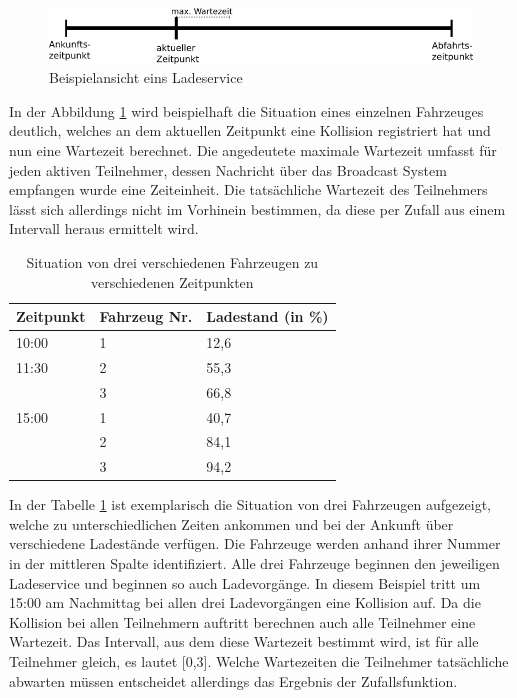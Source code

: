 \begin{figure}[htb]
	\includegraphics[width = \linewidth]{img/SA_participants_Graph2.png}
	\caption{Beispielansicht eins Ladeservice}
	\label{SAPart:Graph}
\end{figure}

In der Abbildung \ref{SAPart:Graph} wird beispielhaft die Situation eines einzelnen Fahrzeuges deutlich, welches an dem aktuellen Zeitpunkt eine Kollision registriert hat und nun eine Wartezeit berechnet. Die angedeutete maximale Wartezeit umfasst für jeden aktiven Teilnehmer, dessen Nachricht über das Broadcast System empfangen wurde eine Zeiteinheit. Die tatsächliche Wartezeit des Teilnehmers lässt sich allerdings nicht im Vorhinein bestimmen, da diese per Zufall aus einem Intervall heraus ermittelt wird.
\begin{table}[htb]
\centering
\begin{tabular}{|l|l|l|}
\hline
Zeitpunkt & Fahrzeug Nr. & Ladestand (in \%) \\ \hline \hline
10:00     & 1            & 12,6      \\ \hline
11:30     & 2            & 55,3      \\ \hline
          & 3            & 66,8      \\ \hline
15:00     & 1            & 40,7      \\ \hline
          & 2            & 84,1      \\ \hline
          & 3            & 94,2      \\ \hline
\end{tabular}
\caption{Situation von drei verschiedenen Fahrzeugen zu verschiedenen Zeitpunkten}
\label{tab:example1}
\end{table}

In der Tabelle \ref{tab:example1} ist exemplarisch die Situation von drei Fahrzeugen aufgezeigt, welche zu unterschiedlichen Zeiten ankommen und bei der Ankunft über verschiedene Ladestände verfügen. Die Fahrzeuge werden anhand ihrer Nummer in der mittleren Spalte identifiziert. Alle drei Fahrzeuge beginnen den jeweiligen Ladeservice und beginnen so auch Ladevorgänge. In diesem Beispiel tritt um 15:00 am Nachmittag bei allen drei Ladevorgängen eine Kollision auf. Da die Kollision bei allen Teilnehmern auftritt berechnen auch alle Teilnehmer eine Wartezeit. Das Intervall, aus dem diese Wartezeit bestimmt wird, ist für alle Teilnehmer gleich, es lautet [0,3]. Welche Wartezeiten die Teilnehmer tatsächliche abwarten müssen entscheidet allerdings das Ergebnis der Zufallsfunktion.

